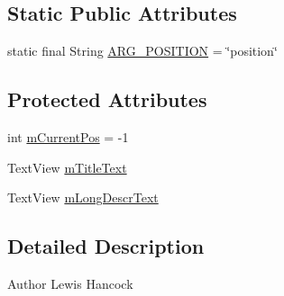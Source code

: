 \subsection*{Static Public Attributes}
\begin{DoxyCompactItemize}
\item 
static final String \hyperlink{classuk_1_1ac_1_1swan_1_1digitaltrails_1_1fragments_1_1_walk_details_fragment_a02d99d54cee133857e5cfa141b6e778f}{A\+R\+G\+\_\+\+P\+O\+S\+I\+T\+I\+O\+N} = \char`\"{}position\char`\"{}
\end{DoxyCompactItemize}
\subsection*{Protected Attributes}
\begin{DoxyCompactItemize}
\item 
int \hyperlink{classuk_1_1ac_1_1swan_1_1digitaltrails_1_1fragments_1_1_walk_details_fragment_ab621239845b9a219b0c977a988c3a931}{m\+Current\+Pos} = -\/1
\item 
Text\+View \hyperlink{classuk_1_1ac_1_1swan_1_1digitaltrails_1_1fragments_1_1_walk_details_fragment_a9413fe91d82c12dd82f7d09040e6363e}{m\+Title\+Text}
\item 
Text\+View \hyperlink{classuk_1_1ac_1_1swan_1_1digitaltrails_1_1fragments_1_1_walk_details_fragment_ad3a7b2a803acadbc7fdaee19e0d72c81}{m\+Long\+Descr\+Text}
\end{DoxyCompactItemize}


\subsection{Detailed Description}
\begin{DoxyAuthor}{Author}
Lewis Hancock 
\end{DoxyAuthor}


